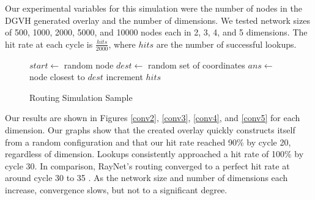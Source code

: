 Our experimental variables for this simulation were the number of nodes in the DGVH generated overlay and the number of dimensions.  
We tested network sizes of 500, 1000, 2000, 5000, and 10000 nodes each in 2, 3, 4, and 5 dimensions.
The hit rate at each cycle is $\frac{hits}{2000}$, where $hits$ are the number of successful lookups.




\begin{figure}
	\caption{Routing Simulation Sample}
	\label{routesim}
	\begin{algorithmic}[1]  %
		\State $start \leftarrow$ random node
		\State $dest \leftarrow$ random set of coordinates
		\State $ans \leftarrow$ node closest to $dest$
		\State increment $hits$
		\EndIf
	\end{algorithmic} 
\end{figure}



Our results are shown in Figures \ref{conv2}, \ref{conv3}, \ref{conv4}, and \ref{conv5} for each dimension.
Our graphs show that the created overlay quickly constructs itself from a random configuration and that our hit rate reached 90\% by cycle 20, regardless of dimension.
Lookups consistently approached a hit rate of 100\% by cycle 30. 
In comparison, RayNet's routing converged to a perfect hit rate at around cycle 30 to 35 \cite{raynet}.
As the network size and number of dimensions each increase, convergence slows, but not to a significant degree.

